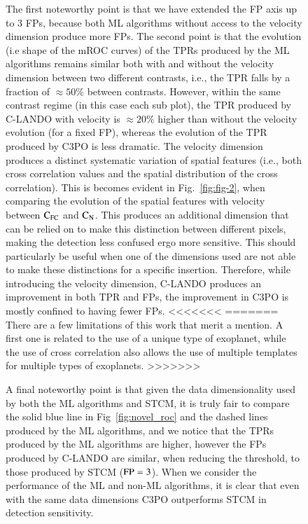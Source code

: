 \documentclass{aa}
\begin{document}
{{{\begin{figure}
{The first noteworthy point is that we have extended the FP axis up to $3$ FPs, because both ML algorithms without access to the velocity dimension produce more FPs.
The second point is that the evolution (i.e shape of the mROC curves) of the TPRs produced by the ML algorithms remains similar both with and without the velocity dimension between two different contrasts, i.e., the TPR falls by a fraction of $\approx 50\%$ between contrasts.
However, within the same contrast regime (in this case each sub plot), the TPR produced by C-LANDO with velocity is $\approx 20\%$ higher than without the velocity evolution (for a fixed FP), whereas the evolution of the TPR produced by C3PO is less dramatic.
The velocity dimension produces a distinct systematic variation of spatial features (i.e., both cross correlation values and the spatial distribution of the cross correlation).
This is becomes evident in Fig.~\ref{fig:fig-2}, when comparing the evolution of the spatial features with velocity between $\rm{C_{FC}}$ and $\rm{C_N}$.
This produces an additional dimension that can be relied on to make this distinction between different pixels, making the detection less confused ergo more sensitive.
This should particularly be useful when one of the dimensions used are not able to make these distinctions for a specific insertion.
Therefore, while introducing the velocity dimension, C-LANDO produces an improvement in both TPR and FPs, the improvement in C3PO is mostly confined to having fewer FPs.
<<<<<<<
=======
There are a few limitations of this work that merit a mention.
A first one is related to the use of a unique type of exoplanet, while the use of cross correlation also allows the use of multiple templates for multiple types of exoplanets.
>>>>>>>

A final noteworthy point is that given the data dimensionality used by both the ML algorithms and STCM, it is truly fair to compare the solid blue line in Fig~\ref{fig:novel_roc} and the dashed lines produced by the ML algorithms, and we notice that the TPRs produced by the ML algorithms are higher, however the FPs produced by C-LANDO are similar, when reducing the threshold, to those produced by STCM (${\rm FP}=3$). 
When we consider the performance of the ML and non-ML algorithms, it is clear that even with the same data dimensions C3PO outperforms STCM in detection sensitivity.



}
\end{figure}}}}
\end{document}
